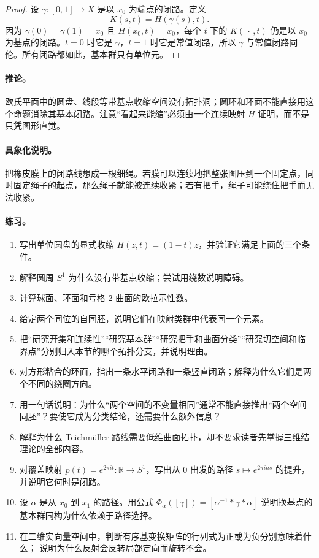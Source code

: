 \documentclass[UTF8,fontset=none,a4paper,11pt]{ctexart}
\theoremstyle{foundation-definition}
\theoremstyle{foundation-theorem}
\theoremstyle{foundation-proposition}
\theoremstyle{foundation-example}
\theoremstyle{foundation-remark}
\theoremstyle{foundation-theorem}
\begin{document}
\begin{proof}
设 \(\gamma:[0,1]\to X\) 是以 \(x_0\) 为端点的闭路。定义
\[
K(s,t)=H(\gamma(s),t).
\]
因为 \(\gamma(0)=\gamma(1)=x_0\) 且 \(H(x_0,t)=x_0\)，每个 \(t\) 下的 \(K(\,\cdot\,,t)\) 仍是以 \(x_0\) 为基点的闭路。\(t=0\) 时它是 \(\gamma\)，\(t=1\) 时它是常值闭路，所以 \(\gamma\) 与常值闭路同伦。所有闭路都如此，基本群只有单位元。
\end{proof}

\paragraph{推论。}
欧氏平面中的圆盘、线段等带基点收缩空间没有拓扑洞；圆环和环面不能直接用这个命题消除其基本闭路。注意“看起来能缩”必须由一个连续映射 \(H\) 证明，而不是只凭图形直觉。

\paragraph{具象化说明。}
把橡皮膜上的闭路线想成一根细绳。若膜可以连续地把整张图压到一个固定点，同时固定绳子的起点，那么绳子就能被连续收紧；若有把手，绳子可能绕住把手而无法收紧。

\clearpage
\thispagestyle{fancy}
\paragraph{练习。}
\begin{enumerate}[label=M4.\arabic*.]
  \item 写出单位圆盘的显式收缩 \(H(z,t)=(1-t)z\)，并验证它满足上面的三个条件。
  \item 解释圆周 \(S^1\) 为什么没有带基点收缩；尝试用绕数说明障碍。
  \item 计算球面、环面和亏格 \(2\) 曲面的欧拉示性数。
  \item 给定两个同位的自同胚，说明它们在映射类群中代表同一个元素。
  \item 把“研究开集和连续性”“研究基本群”“研究把手和曲面分类”“研究切空间和临界点”分别归入本节的哪个拓扑分支，并说明理由。
  \item 对方形粘合的环面，指出一条水平闭路和一条竖直闭路；解释为什么它们是两个不同的绕圈方向。
  \item 用一句话说明：为什么“两个空间的不变量相同”通常不能直接推出“两个空间同胚”？要使它成为分类结论，还需要什么额外信息？
  \item 解释为什么 Teichmüller 路线需要低维曲面拓扑，却不要求读者先掌握三维结理论的全部内容。
  \item 对覆盖映射 \(p(t)=e^{2\pi i t}:\mathbb R\to S^1\)，写出从 \(0\) 出发的路径
  \(s\mapsto e^{2\pi i ns}\) 的提升，并说明它何时是闭路。
  \item 设 \(\alpha\) 是从 \(x_0\) 到 \(x_1\) 的路径。用公式
  \(\Phi_\alpha([\gamma])=[\alpha^{-1}*\gamma*\alpha]\) 说明换基点的基本群同构为什么依赖于路径选择。
  \item 在二维实向量空间中，判断有序基变换矩阵的行列式为正或为负分别意味着什么；
  说明为什么反射会反转局部定向而旋转不会。
\end{enumerate}
\end{document}
